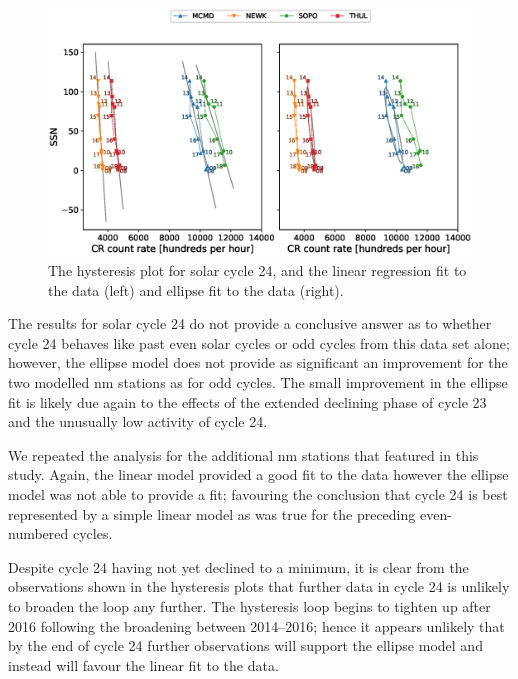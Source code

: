 \begin{figure}
	\includegraphics[width=\columnwidth]{24.eps}
	\caption{The hysteresis plot for solar cycle 24, and the linear regression fit to the data (left) and ellipse fit to the data (right).}
	\label{fig:24}
\end{figure}

The results for solar cycle 24 do not provide a conclusive answer as to whether cycle 24 behaves like past even solar cycles or odd cycles from this data set alone; however, the ellipse model does not provide as significant an improvement for the two modelled \gls{nm} stations as for odd cycles. The small improvement in the ellipse fit is likely due again to the effects of the extended declining phase of cycle 23 and the unusually low activity of cycle 24.

We repeated the analysis for the additional \gls{nm} stations that featured in this study. Again, the linear model provided a good fit to the data however the ellipse model was not able to provide a fit; favouring the conclusion that cycle 24 is best represented by a simple linear model as was true for the preceding even-numbered cycles.

Despite cycle 24 having not yet declined to a minimum, it is clear from the observations shown in the hysteresis plots that further data in cycle 24 is unlikely to broaden the loop any further. The hysteresis loop begins to tighten up after 2016 following the broadening between 2014--2016; hence it appears unlikely that by the end of cycle 24 further observations will support the ellipse model and instead will favour the linear fit to the data.


